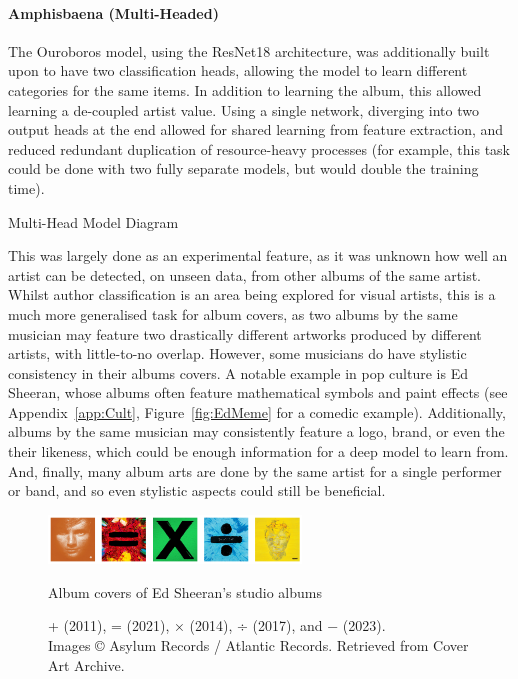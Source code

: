                 \paragraph{Amphisbaena (Multi-Headed)}
    
                The Ouroboros model, using the ResNet18 architecture, was additionally built upon to have two classification heads, allowing the model to learn different categories for the same items. In addition to learning the album, this allowed learning a de-coupled artist value. Using a single network, diverging into two output heads at the end allowed for shared learning from feature extraction, and reduced redundant duplication of resource-heavy processes (for example, this task could be done with two fully separate models, but would double the training time).
    
                \begin{temp}
                    Multi-Head Model Diagram
                \end{temp}
    
                This was largely done as an experimental feature, as it was unknown how well an artist can be detected, on unseen data, from other albums of the same artist. Whilst author classification is an area being explored for visual artists, this is a much more generalised task for album covers, as two albums by the same musician may feature two drastically different artworks produced by different artists, with little-to-no overlap. However, some musicians do have stylistic consistency in their albums covers. A notable example in pop culture is Ed Sheeran, whose albums often feature mathematical symbols and paint effects (see Appendix~\ref{app:Cult}, Figure~\ref{fig:EdMeme} for a comedic example). Additionally, albums by the same musician may consistently feature a logo, brand, or even the their likeness, which could be enough information for a deep model to learn from. And, finally, many album arts are done by the same artist for a single performer or band, and so even stylistic aspects could still be beneficial.
    
                \begin{figure}[h]
                    \centering
                    \includegraphics[width=0.6\textwidth]{images/EdAlbums.png}
                    \caption{Album covers of Ed Sheeran’s studio albums}
                    \label{fig:EdAlbums}
                    \caption*{+ (2011), = (2021), × (2014), ÷ (2017), and − (2023). \\ Images © Asylum Records / Atlantic Records. Retrieved from Cover Art Archive.}
                \end{figure}
    
